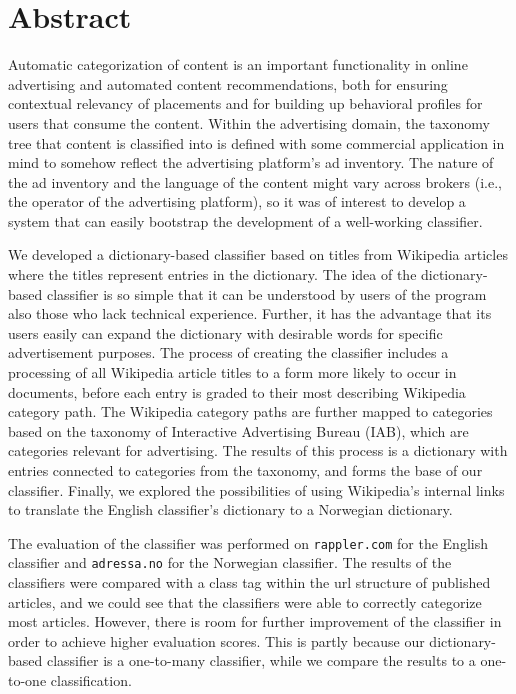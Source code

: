 \chapter*{Abstract}
Automatic categorization of content is an important %
functionality in online advertising and automated content recommendations, both for ensuring contextual relevancy of placements and for building up behavioral profiles for users that consume the content. Within the advertising domain, the taxonomy tree that content is classified into is defined with some commercial application in mind to somehow reflect the advertising platform’s ad inventory. The nature of the ad inventory and the language of the content might vary across brokers (i.e., the operator of the advertising platform), so it was of interest to develop a system that can easily bootstrap the development of a well-working classifier. 

We developed a dictionary-based classifier based on titles from Wikipedia articles where the titles represent entries in the dictionary. The idea of the dictionary-based classifier is so simple that it can be understood by users of the program also those who lack technical experience. Further, it has the advantage that its users easily can expand the dictionary with desirable words for specific advertisement purposes. The process of creating the classifier includes a processing of all Wikipedia article titles to a form more likely to occur in documents, before each entry is graded to their most describing Wikipedia category path. The Wikipedia category paths are further mapped to categories based on the taxonomy of Interactive Advertising Bureau (IAB), which are categories relevant for advertising. The results of this process is a dictionary with entries connected to categories from the taxonomy, and forms the base of our classifier. Finally, we explored the possibilities of using Wikipedia's internal links to translate the English classifier's dictionary to a Norwegian dictionary.

The evaluation of the classifier was performed on \texttt{rappler.com} for the English classifier and \texttt{adressa.no} for the Norwegian classifier. The results of the classifiers were compared with a class tag within the url structure of published articles, and we could see that the classifiers were able to correctly categorize most articles. 
However, there is room for further improvement of the classifier in order to achieve higher evaluation scores. This is partly because our dictionary-based classifier is a one-to-many classifier, while we compare the results to a one-to-one classification.

